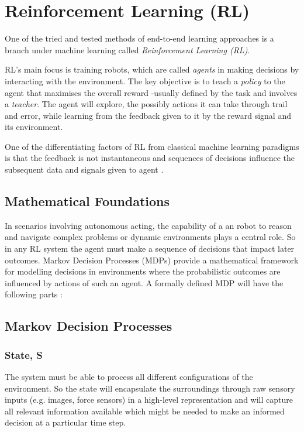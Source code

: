\section{Reinforcement Learning (RL)}
  One of the tried and tested methods of end-to-end learning approaches is a branch under machine learning called \emph{Reinforcement Learning (RL)}. 

  RL's main focus is training robots, which are called \emph{agents} in making decisions by interacting with the environment. The key objective is to teach a \emph{policy} to the agent that maximises the overall reward -usually defined by the task and involves a \emph{teacher}. The agent will explore, the possibly actions it can take through trail and error, while learning from the feedback given to it by the reward signal and its environment.

  One of the differentiating factors of RL from classical machine learning paradigms is that the feedback is not instantaneous and sequences of decisions influence the subsequent data and signals given to agent \cite{silver2015}.

  \subsection{Mathematical Foundations}

  In scenarios involving autonomous acting, the capability of a an robot to reason and navigate complex problems or dynamic environments plays a central role. So in any RL system the agent must make a sequence of decisions that impact later outcomes. Markov Decision Processes (MDPs) provide a mathematical framework for modelling decisions in environments where the probabilistic outcomes are influenced by actions of such an agent. A formally defined MDP will have the following parts \cite{silver2015}:

\subsection{Markov Decision Processes}
  \subsubsection{State, S}
    The system must be able to process all different configurations of the environment. So the state will encapsulate the surroundings through raw sensory inputs (e.g. images, force sensors) in a high-level representation and will capture all relevant information available \cite{Sutton1998} which might be needed to make an informed decision at a particular time step.

